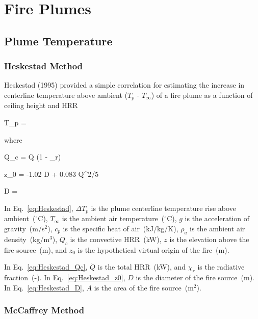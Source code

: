 
\chapter{Fire Plumes}
\label{Plume_Chapter}

\section{Plume Temperature}

\subsection{Heskestad Method}

Heskestad (1995) provided a simple correlation for estimating the increase in centerline temperature above ambient ($T_p$ - $T_\infty$) of a fire plume as a function of ceiling height and HRR

\be
\Delta T_p = 
\label{eq:Heskestad}
\ee

\noindent where

\be
\dot Q_c = \dot Q (1 - \chi_r)
\label{eq:Heskestad_Qc}
\ee

\be
z_0 = -1.02 D + 0.083 \dot Q^{2/5}
\label{eq:Heskestad_z0}
\ee

\be
D = 
\label{eq:Heskestad_D}
\ee

In Eq.~\ref{eq:Heskestad}, $\Delta T_p$ is the plume centerline temperature rise above ambient~($^\circ$C), $T_\infty$ is the ambient air temperature~($^\circ$C), $g$ is the acceleration of gravity~(m/s$^2$), $c_p$ is the specific heat of air~(kJ/kg/K), $\rho_{a}$ is the ambient air density~(kg/m$^3$), $\dot Q_c$ is the convective HRR~(kW), $z$ is the elevation above the fire source~(m), and $z_0$ is the hypothetical virtual origin of the fire~(m).

In Eq.~\ref{eq:Heskestad_Qc}, $\dot Q$ is the total HRR~(kW), and $\chi_r$ is the radiative fraction~(-). In Eq.~\ref{eq:Heskestad_z0}, $D$ is the diameter of the fire source~(m). In Eq.~\ref{eq:Heskestad_D}, $A$ is the area of the fire source~(m$^2$).


\clearpage


\subsection{McCaffrey Method}


